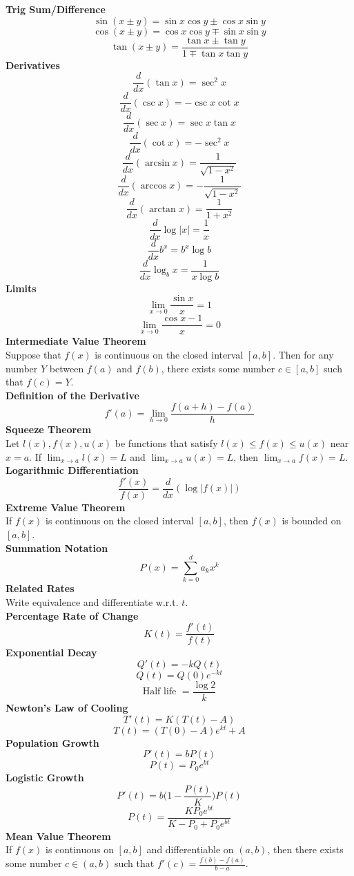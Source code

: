 \documentclass[10pt]{article}
\begin{document}
\begin{multicols}{3}

\textbf{Trig Sum/Difference}
\[\sin(x\pm y)=\sin x \cos y \pm \cos x \sin y\]
\[\cos(x\pm y)=\cos x \cos y \mp \sin x \sin y\]
\[\tan(x\pm y)=\frac{\tan x \pm \tan y}{1 \mp \tan x \tan y}\]
\textbf{Derivatives} 
\[\frac{d}{dx} (\tan x)=\sec^2 x\]
\[\frac{d}{dx} (\csc x)=-\csc x \cot x\]
\[\frac{d}{dx} (\sec x)=\sec x \tan x\]
\[\frac{d}{dx} (\cot x)=-\sec^2 x\]
\[\frac{d}{dx} (\arcsin x)=\frac{1}{\sqrt{1-x^2}}\]
\[\frac{d}{dx} (\arccos x)=-\frac{1}{\sqrt{1-x^2}}\]
\[\frac{d}{dx} (\arctan x)=\frac{1}{1+x^2}\]
\[\frac{d}{dx} \log |x| = \frac{1}{x}\]
\[\frac{d}{dx} b^x = b^x \log b\]
\[\frac{d}{dx} \log_b x=\frac{1}{x\log b}\]
\textbf{Limits}
\[\lim_{x\to 0}\frac{\sin x}{x}=1\]
\[\lim_{x\to 0}\frac{\cos x - 1}{x}=0\]
\textbf{Intermediate Value Theorem} \\
Suppose that $f(x)$ is continuous on the closed interval $[a,b]$. Then for any number $Y$ between $f(a)$ and $f(b)$, there exists some number $c\in [a,b]$ such that $f(c)=Y$. \\
\textbf{Definition of the Derivative} 
\[f'(a)=\lim_{h\to 0}\frac{f(a+h)-f(a)}{h}\]
\textbf{Squeeze Theorem} \\
Let $l(x),f(x),u(x)$ be functions that satisfy $l(x)\le f(x)\le u(x)$ near $x=a$. If $\lim_{x\to a}l(x)=L$ and $\lim_{x\to a}u(x)=L$, then $\lim_{x\to a}f(x)=L$. \\
\textbf{Logarithmic Differentiation}
\[\frac{f'(x)}{f(x)}=\frac{d}{dx}(\log |f(x)|)\]
\textbf{Extreme Value Theorem} \\
If $f(x)$ is continuous on the closed interval $[a,b]$, then $f(x)$ is bounded on $[a,b]$. \\
\textbf{Summation Notation} 
\[P(x)=\sum_{k=0}^d a_kx^k\]
\textbf{Related Rates} \\
Write equivalence and differentiate w.r.t. $t$. \\
\textbf{Percentage Rate of Change}
\[K(t)=\frac{f'(t)}{f(t)}\]
\textbf{Exponential Decay}
\[Q'(t)=-kQ(t)\]
\[Q(t)=Q(0)e^{-kt}\]
\[\text{Half life }=\frac{\log 2}{k}\]
\textbf{Newton's Law of Cooling}
\[T'(t)=K(T(t)-A)\]
\[T(t)=(T(0)-A)e^{kt}+A\]
\textbf{Population Growth}
\[P'(t)=bP(t)\]
\[P(t)=P_0 e^{bt}\]
\textbf{Logistic Growth}
\[P'(t)=b\Big(1-\frac{P(t)}{K}\Big)P(t)\]
\[P(t)=\frac{KP_0e^{bt}}{K-P_0+P_0e^{bt}}\]
\textbf{Mean Value Theorem} \\
If $f(x)$ is continuous on $[a,b]$ and differentiable on $(a,b)$, then there exists some number $c\in(a,b)$ such that $f'(c)=\frac{f(b)-f(a)}{b-a}$. \\

\end{multicols}
\end{document}
